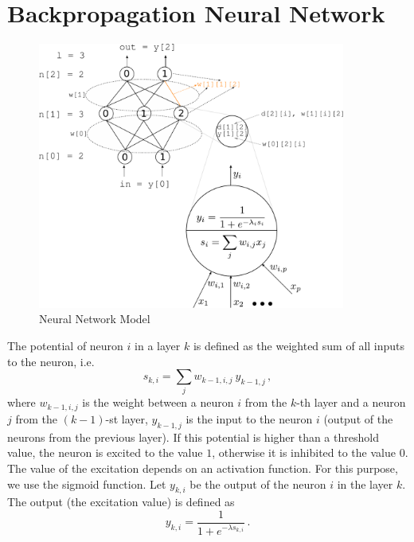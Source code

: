 \documentclass[12pt]{article}
\begin{document}
\section*{Backpropagation Neural Network}
\begin{figure}[h!]
\center
\includegraphics[width=0.9\textwidth]{drawing.pdf}
\caption{Neural Network Model}
\label{fig:1}
\end{figure}

The potential of neuron $i$ in a layer $k$ is defined as the weighted sum of all inputs to the neuron, i.e.
\begin{equation}
\label{eq:1}
s_{k,i} = \sum_{j} w_{k-1,i,j}\:  y_{k-1,j} \, ,
\end{equation}
where $w_{k-1,i,j}$ is the weight between a neuron $i$ from the $k$-th layer and a neuron $j$ from the $(k-1)$-st layer, $y_{k-1,j}$ is the input to the neuron $i$ (output of the neurons from the previous layer).
If this potential is higher than a threshold value, the neuron is excited to the value $1$, otherwise it is inhibited to the value $0$.
The value of the excitation depends on an activation function.
For this purpose, we use the sigmoid function.
Let $y_{k,i}$ be the output of the neuron $i$ in the layer $k$. 
The output (the excitation value) is defined as
\begin{equation}
\label{eq:2}
y_{k,i} = \frac{1}{1+e^{-\lambda s_{k,i}}} \, .
\end{equation}
\end{document}
